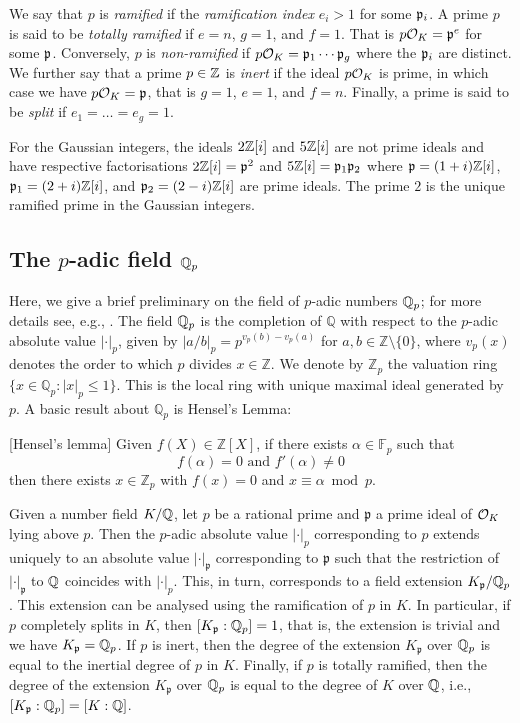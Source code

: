 We say that $p$ is \emph{ramified} if the \emph{ramification index} $e_i > 1$ for some $\mathfrak{p}_i$. A prime $p$ is said to be \emph{totally ramified} if $e=n$, $g=1$, and $f=1$. That is $p\mathcal{O}_K = \mathfrak{p}^{e}$ for some $\mathfrak{p}$.
 Conversely, $p$ is \emph{non-ramified} if $p\mathcal{O}_K = \mathfrak{p}_1 \cdots \mathfrak{p}_g$ where the $\mathfrak{p}_i$ are distinct. We further say that a prime $p\in\mathbb{Z}$ is \emph{inert} if the ideal $p\mathcal{O}_K$ is prime, in which case we have $p\mathcal{O}_K = \mathfrak{p}$, that is $g=1$, $e=1$, and $f=n$.
 Finally, a prime is said to be \emph{split} if $e_1 = \ldots = e_g = 1$.
 
For the Gaussian integers, the ideals $2\mathbb{Z}[i]$ and $5\mathbb{Z}[i]$ are not  prime ideals and have respective factorisations $2\mathbb{Z}[i]=\mathfrak{p}^2$ and $5\mathbb{Z}[i]=\mathfrak{p}_1\mathfrak{p}_2$ where $\mathfrak{p}=(1+i)\mathbb{Z}[i]$, $\mathfrak{p}_1=(2+i)\mathbb{Z}[i]$, and $\mathfrak{p}_2=(2-i)\mathbb{Z}[i]$ are prime ideals. The prime $2$ is the unique ramified prime in the Gaussian integers.



\subsection{The $p$-adic field $\mathbb{Q}_p$}

Here, we give a brief preliminary on the field of $p$-adic numbers $\mathbb{Q}_p$; for more details see, e.g., \cite{gouvea2003p}. 
The field $\mathbb{Q}_p$ is the completion of $\mathbb{Q}$ with respect to the $p$-adic absolute value $|\cdot|_p$, given by 
$|a/b|_p = p^{v_p(b)-v_p(a)}$ for $a,b\in \mathbb{Z}\setminus \{0\}$,
where $v_p(x)$ denotes the order to which $p$ divides $x \in \mathbb{Z}$. We denote by $\mathbb{Z}_p$ the valuation ring 
$\{ x \in \mathbb{Q}_p : |x|_p \leq 1\}$.
This is the local ring with unique maximal ideal generated by $p$.
A basic result about $\mathbb{Q}_p$ is Hensel's Lemma:

\begin{lemma}
\label{lem:hensel}[Hensel's lemma]
	Given $f(X) \in \mathbb{Z}[X]$, if there exists $\alpha \in \mathbb{F}_p$ such that 
	\[f(\alpha)=0 \text{ and } f'(\alpha)\neq 0\]
then there exists $x \in \mathbb{Z}_p$ with $f(x)=0$ and $x\equiv \alpha \bmod p$.
\end{lemma}

Given a number field $K/\mathbb{Q}$, let $p$ be a rational prime and $\mathfrak{p}$ a prime ideal of $\mathcal{O}_K$ lying above $p$. Then the $p$-adic absolute value $|\cdot|_p$ corresponding to $p$ extends uniquely to an absolute value $|\cdot|_\mathfrak{p}$ corresponding to $\mathfrak{p}$ such that the restriction of $|\cdot|_\mathfrak{p}$  to $\mathbb{Q}$ coincides with $|\cdot|_p$.
This, in turn, corresponds to a field extension $K_{\mathfrak{p}}/\mathbb{Q}_p$. This extension can be analysed using the ramification of $p$ in $K$. In particular, if $p$ completely splits in $K$, then $[K_{\mathfrak{p}} : \mathbb{Q}_p] = 1$, that is, the extension is trivial and we have $K_{\mathfrak{p}} = \mathbb{Q}_p$. If $p$ is inert, then the degree of the extension $K_{\mathfrak{p}}$ over $\mathbb{Q}_p$ is equal to the inertial degree of $p$ in $K$. Finally, if $p$ is totally ramified, then the degree of the extension $K_{\mathfrak{p}}$ over $\mathbb{Q}_p$ is equal to the degree of $K$ over $\mathbb{Q}$, i.e., $[K_{\mathfrak{p}} : \mathbb{Q}_p] = [K : \mathbb{Q}]$.

